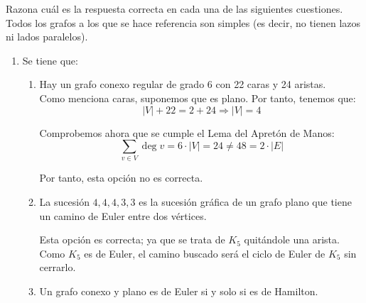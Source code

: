 \begin{ejercicio}\label{ej:1.40}
    Razona cuál es la respuesta correcta en cada una de las siguientes cuestiones. Todos los grafos a los que se hace referencia son simples (es decir, no tienen lazos ni lados paralelos).
    \begin{enumerate}
        \item Se tiene que:
        \begin{enumerate}
            \item Hay un grafo conexo regular de grado 6 con 22 caras y 24 aristas.\\
            
            Como menciona caras, suponemos que es plano. Por tanto, tenemos que:
            \begin{equation*}
                |V|+22=2+24\Longrightarrow |V|=4
            \end{equation*}

            Comprobemos ahora que se cumple el Lema del Apretón de Manos:
            \begin{equation*}
                \sum_{v\in V}\deg v=6\cdot |V|=24\neq 48=2\cdot |E|
            \end{equation*}

            Por tanto, esta opción no es correcta.

            \item La sucesión $4, 4, 4, 3, 3$ es la sucesión gráfica de un grafo plano que tiene un camino de Euler entre dos vértices.
            
            Esta opción es correcta; ya que se trata de $K_5$ quitándole una arista. Como $K_5$ es de Euler, el camino buscado será el ciclo de Euler de $K_5$ sin cerrarlo.
            \item Un grafo conexo y plano es de Euler si y solo si es de Hamilton.\\
            

\end{enumerate}
\end{enumerate}
\end{ejercicio}
